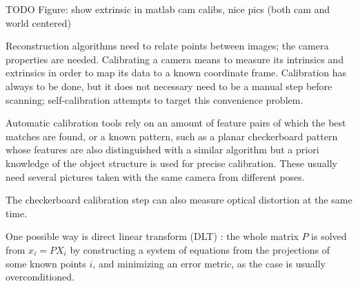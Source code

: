 TODO Figure: show extrinsic in matlab cam calibs, nice pics (both cam and world centered)


Reconstruction algorithms need to relate points between images; the camera properties are needed.
Calibrating a camera means to measure its intrinsics and extrinsics in order to map its data to a known coordinate frame.
Calibration has always to be done, but it does not necessary need to be a manual step before scanning; self-calibration attempts to target this convenience problem. \cite{pollefeys1999hand,hartley03multiview}


Automatic calibration tools rely on an amount of feature pairs of which the best matches are found, or a known pattern, such as a planar checkerboard pattern \cite{chuang2002performance,zhang2000flexible} whose features are also distinguished with a similar algorithm but a priori knowledge of the object structure is used for precise calibration.
These usually need several pictures taken with the same camera from different poses.

The checkerboard calibration step can also measure optical distortion at the same time. \cite{opencv,camcalmatlab}



One possible way is direct linear transform (DLT)
\cite{hartley03multiview}: the whole matrix $P$ is solved from $x_i = PX_i$ by constructing a system of equations from the projections of some known points $i$, and minimizing an error metric, as the case is usually overconditioned.





